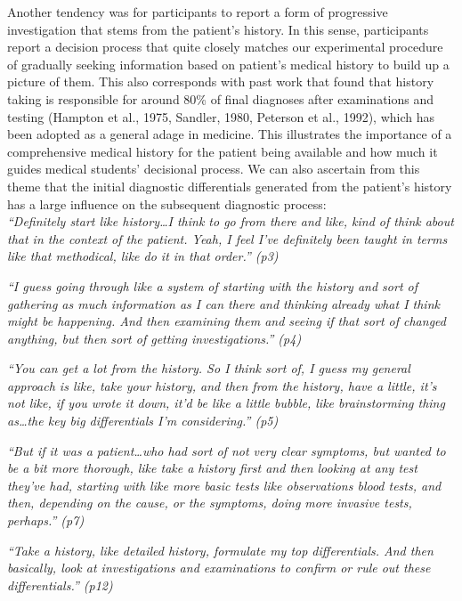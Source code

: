 \documentclass[a4paper, nobind]{templates/ociamthesis}
\begin{document}
\hfill\break
Another tendency was for participants to report a form of progressive investigation that stems from the patient's history. In this sense, participants report a decision process that quite closely matches our experimental procedure of gradually seeking information based on patient's medical history to build up a picture of them. This also corresponds with past work that found that history taking is responsible for around 80\% of final diagnoses after examinations and testing (Hampton et al., 1975, Sandler, 1980, Peterson et al., 1992), which has been adopted as a general adage in medicine. This illustrates the importance of a comprehensive medical history for the patient being available and how much it guides medical students' decisional process. We can also ascertain from this theme that the initial diagnostic differentials generated from the patient's history has a large influence on the subsequent diagnostic process:\\

\emph{``Definitely start like history\ldots I think to go from there and like, kind of think about that in the context of the patient. Yeah, I feel I've definitely been taught in terms like that methodical, like do it in that order.'' (p3)}

\emph{``I guess going through like a system of starting with the history and sort of gathering as much information as I can there and thinking already what I think might be happening. And then examining them and seeing if that sort of changed anything, but then sort of getting investigations.'' (p4)}

\emph{``You can get a lot from the history. So I think sort of, I guess my general approach is like, take your history, and then from the history, have a little, it's not like, if you wrote it down, it'd be like a little bubble, like brainstorming thing as\ldots the key big differentials I'm considering.'' (p5)}

\emph{``But if it was a patient\ldots who had sort of not very clear symptoms, but wanted to be a bit more thorough, like take a history first and then looking at any test they've had, starting with like more basic tests like observations blood tests, and then, depending on the cause, or the symptoms, doing more invasive tests, perhaps.'' (p7)}

\emph{``Take a history, like detailed history, formulate my top differentials. And then basically, look at investigations and examinations to confirm or rule out these differentials.'' (p12)}
\end{document}
